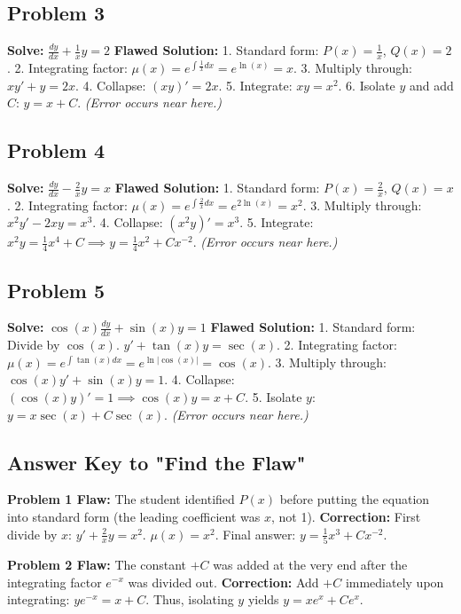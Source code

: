 \documentclass[11pt]{article}
\begin{document}
\subsection*{Problem 3}
\textbf{Solve:} $\frac{dy}{dx} + \frac{1}{x}y = 2$
\textbf{Flawed Solution:}
1. Standard form: $P(x) = \frac{1}{x}$, $Q(x) = 2$.
2. Integrating factor: $\mu(x) = e^{\int \frac{1}{x} dx} = e^{\ln(x)} = x$.
3. Multiply through: $x y' + y = 2x$.
4. Collapse: $(xy)' = 2x$.
5. Integrate: $xy = x^2$.
6. Isolate $y$ and add $C$: $y = x + C$.
\textit{(Error occurs near here.)}

\subsection*{Problem 4}
\textbf{Solve:} $\frac{dy}{dx} - \frac{2}{x} y = x$
\textbf{Flawed Solution:}
1. Standard form: $P(x) = \frac{2}{x}$, $Q(x) = x$.
2. Integrating factor: $\mu(x) = e^{\int \frac{2}{x} dx} = e^{2\ln(x)} = x^2$.
3. Multiply through: $x^2 y' - 2x y = x^3$.
4. Collapse: $(x^2 y)' = x^3$.
5. Integrate: $x^2 y = \frac{1}{4}x^4 + C \implies y = \frac{1}{4}x^2 + Cx^{-2}$.
\textit{(Error occurs near here.)}

\subsection*{Problem 5}
\textbf{Solve:} $\cos(x) \frac{dy}{dx} + \sin(x) y = 1$
\textbf{Flawed Solution:}
1. Standard form: Divide by $\cos(x)$. $y' + \tan(x) y = \sec(x)$.
2. Integrating factor: $\mu(x) = e^{\int \tan(x) dx} = e^{\ln|\cos(x)|} = \cos(x)$.
3. Multiply through: $\cos(x)y' + \sin(x)y = 1$.
4. Collapse: $(\cos(x)y)' = 1 \implies \cos(x)y = x + C$.
5. Isolate $y$: $y = x\sec(x) + C\sec(x)$.
\textit{(Error occurs near here.)}

\hrulefill

\subsection*{Answer Key to "Find the Flaw"}
\textbf{Problem 1 Flaw:} The student identified $P(x)$ before putting the equation into standard form (the leading coefficient was $x$, not 1). 
\textbf{Correction:} First divide by $x$: $y' + \frac{2}{x}y = x^2$. $\mu(x) = x^2$. Final answer: $y = \frac{1}{5}x^3 + Cx^{-2}$.

\textbf{Problem 2 Flaw:} The constant $+C$ was added at the very end after the integrating factor $e^{-x}$ was divided out.
\textbf{Correction:} Add $+C$ immediately upon integrating: $y e^{-x} = x + C$. Thus, isolating $y$ yields $y = x e^x + C e^x$.
\end{document}
